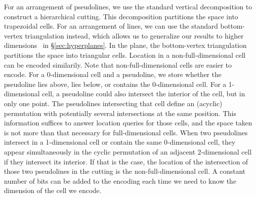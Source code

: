 %
\ifeurocg\else%
For an arrangement of pseudolines, we use the standard vertical decomposition
to construct a hierarchical cutting.
This decomposition partitions the space into trapezoidal cells.
For an arrangement of lines, we can
use the standard bottom-vertex triangulation instead, which allows us to
generalize our results to higher dimensions\ifsocg~\cite{CCILO18}\else{} in
\S\ref{sec:hyperplanes}\fi.
In the plane, the bottom-vertex triangulation partitions the space into
triangular cells.\fi
%
\ifeurocg%
Location in a non-full-dimensional cell can be encoded similarily.%
\else
Note that non-full-dimensional cells are easier to encode. For a 0-dimensional
cell and a pseudoline, we store whether the pseudoline lies above, lies below,
or contains the 0-dimensional cell. For a 1-dimensional cell, a pseudoline
could also intersect the interior of the cell, but in only one point. The
pseudolines intersecting that cell define an (acyclic) permutation with potentially
several intersections at the same position. This information suffices to answer
location queries for those cells, and the space taken is not more than that
necessary for full-dimensional cells. When two pseudolines intersect in a
1-dimensional cell or contain the same 0-dimensional cell, they
appear simultaneously in the cyclic permutation of an adjacent 2-dimensional
cell if they intersect its interior. If that is the case, the location of
the intersection of those two pseudolines in the cutting is the
non-full-dimensional cell. A constant number of bits can be added to the
encoding each time we need to know the dimension of the cell we encode.
\fi
